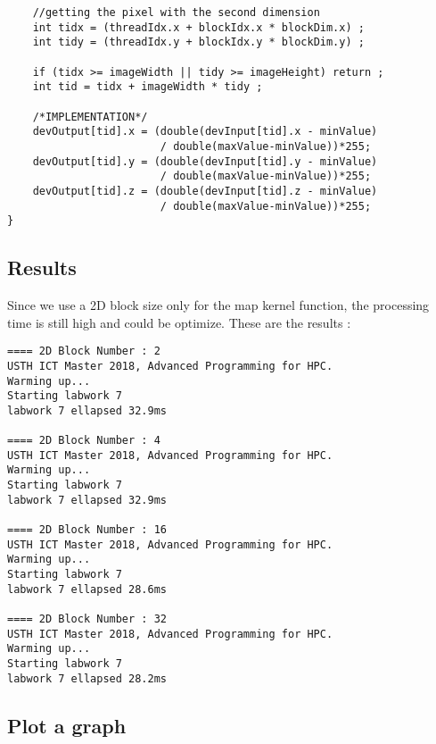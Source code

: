 \documentclass{article}
\begin{document}
\begin{enumerate}
\begin{verbatim}
    //getting the pixel with the second dimension
    int tidx = (threadIdx.x + blockIdx.x * blockDim.x) ; 
    int tidy = (threadIdx.y + blockIdx.y * blockDim.y) ;

    if (tidx >= imageWidth || tidy >= imageHeight) return ;
    int tid = tidx + imageWidth * tidy ;
	
    /*IMPLEMENTATION*/
    devOutput[tid].x = (double(devInput[tid].x - minValue) 
                        / double(maxValue-minValue))*255;
    devOutput[tid].y = (double(devInput[tid].y - minValue) 
                        / double(maxValue-minValue))*255;
    devOutput[tid].z = (double(devInput[tid].z - minValue) 
                        / double(maxValue-minValue))*255;
}
    \end{verbatim}
    
    \end{enumerate}

\subsection{Results}
Since we use a 2D block size only for the map kernel function, the processing time is still high and could be optimize. These are the results :

    \begin{verbatim}
==== 2D Block Number : 2
USTH ICT Master 2018, Advanced Programming for HPC.
Warming up...
Starting labwork 7
labwork 7 ellapsed 32.9ms

==== 2D Block Number : 4
USTH ICT Master 2018, Advanced Programming for HPC.
Warming up...
Starting labwork 7
labwork 7 ellapsed 32.9ms

==== 2D Block Number : 16
USTH ICT Master 2018, Advanced Programming for HPC.
Warming up...
Starting labwork 7
labwork 7 ellapsed 28.6ms

==== 2D Block Number : 32
USTH ICT Master 2018, Advanced Programming for HPC.
Warming up...
Starting labwork 7
labwork 7 ellapsed 28.2ms
    \end{verbatim}

\subsection{Plot a graph}
    
    \newline
\end{document}
